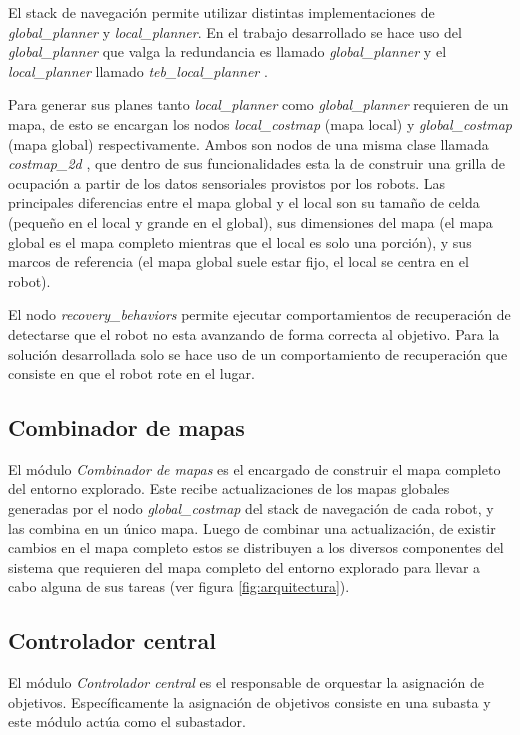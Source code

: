 El stack de navegación permite utilizar distintas implementaciones de
\emph{global\_planner} y \emph{local\_planner}. En el trabajo desarrollado se
hace uso del \emph{global\_planner} que valga la redundancia es llamado
\emph{global\_planner} \cite{ROS-global_planner}  y el \emph{local\_planner}
llamado \emph{teb\_local\_planner} \cite{ROS-teb_local_planner}.

Para generar sus planes tanto \emph{local\_planner} como \emph{global\_planner}
requieren de un mapa, de esto se encargan los nodos \emph{local\_costmap} (mapa
local) y \emph{global\_costmap} (mapa global) respectivamente. Ambos son
nodos de una misma clase llamada \emph{costmap\_2d}
\cite{ROS-costmap_2d}, que dentro de sus funcionalidades esta la de
construir una grilla de ocupación a partir de los datos sensoriales provistos
por los robots. Las principales diferencias entre el mapa global y el local son su
tamaño de celda (pequeño en el local y grande en el global), sus dimensiones
del mapa (el mapa global es el mapa completo mientras que el local es solo una
porción), y sus marcos de referencia (el mapa global suele estar fijo, el local se
centra en el robot).

El nodo \emph{recovery\_behaviors} permite ejecutar comportamientos de
recuperación de detectarse que el robot no esta avanzando de forma correcta al
objetivo. Para la solución desarrollada solo se hace uso de un comportamiento
de recuperación que consiste en que el robot rote en el lugar.

\subsection{Combinador de mapas}
El módulo \emph{Combinador de mapas} es el encargado de construir el mapa
completo del entorno explorado. Este recibe actualizaciones de los mapas
globales generadas por el nodo \emph{global\_costmap} del stack de navegación
de cada robot, y las combina en un único mapa. Luego de combinar una
actualización, de existir cambios en el mapa completo estos se distribuyen a
los diversos componentes del sistema que requieren del mapa completo del
entorno explorado para llevar a cabo alguna de sus tareas (ver figura
\ref{fig:arquitectura}). 

\subsection{Controlador central}

El módulo \emph{Controlador central} es el responsable de orquestar la
asignación de objetivos. Específicamente la asignación de objetivos consiste en
una subasta y este módulo actúa como el subastador. 

